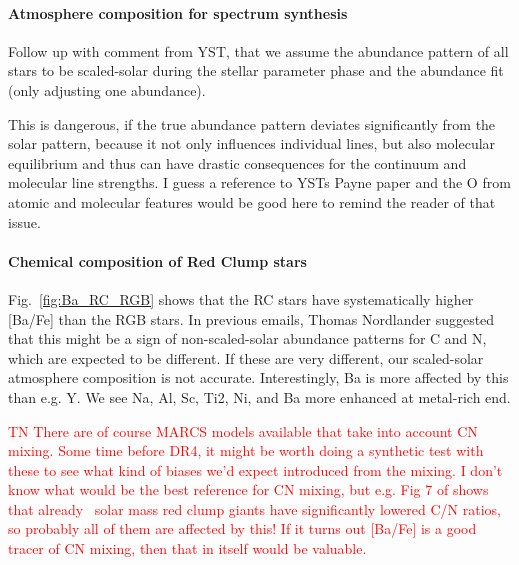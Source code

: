 \documentclass[fleqn,usenatbib,useAMS]{mnras}
\newcommand\TN[1]{\textcolor{red}{TN #1}}
\begin{document}
\paragraph*{Atmosphere composition for spectrum synthesis}

Follow up with comment from YST, that we assume the abundance pattern of all stars to be scaled-solar during the stellar parameter phase and the abundance fit (only adjusting one abundance).

This is dangerous, if the true abundance pattern deviates significantly from the solar pattern, because it not only influences individual lines, but also molecular equilibrium and thus can have drastic consequences for the continuum and molecular line strengths. I guess a reference to YSTs Payne paper and the O from atomic and molecular features would be good here to remind the reader of that issue.

\paragraph*{Chemical composition of Red Clump stars}

Fig.~\ref{fig:Ba_RC_RGB} shows that the RC stars have systematically higher [Ba/Fe] than the RGB stars. In previous emails, Thomas Nordlander suggested that this might be a sign of non-scaled-solar abundance patterns for C and N, which are expected to be different. If these are very different, our scaled-solar atmosphere composition is not accurate. Interestingly, Ba is more affected by this than e.g. Y. We see Na, Al, Sc, Ti2, Ni, and Ba more enhanced at metal-rich end.

\TN{There are of course MARCS models available that take into account CN mixing. Some time before DR4, it might be worth doing a synthetic test with these to see what kind of biases we'd expect introduced from the mixing. I don't know what would be the best reference for CN mixing, but e.g. Fig 7 of \citet{Tautvaisiene2013} shows that already ~solar mass red clump giants have significantly lowered C/N ratios, so probably all of them are affected by this! If it turns out [Ba/Fe] is a good tracer of CN mixing, then that in itself would be valuable.}
\end{document}
